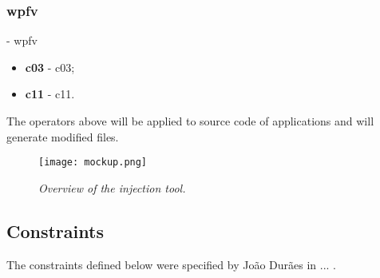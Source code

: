 	\hypertarget{wpfv}{}
	\subsubsection{\textbf{\acs{wpfv}}} - \Acl{wpfv}

	\begin{itemize}
		\item \textbf{\acs{c03}} - \Acl{c03};
		\item \textbf{\acs{c11}} - \Acl{c11}.
	\end{itemize}

The operators above will be applied to source code of applications and will generate modified files.

\begin{figure}[!ht]
\begin{center}
\texttt{[image: mockup.png]}
\caption{\small \sl Overview of the injection tool.\label{fig:mockup}}
\end{center}
\end{figure}

\clearpage
\subsection{Constraints}

The constraints defined below were specified by João Durães in ... .

